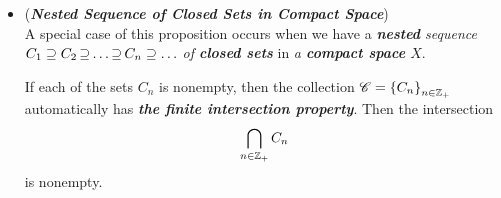 \documentclass[11pt]{article}
\begin{document}
\begin{itemize}
\begin{proof}
\begin{enumerate}
\item $\Rightarrow$  ``\emph{Given any collection $\srC$ of \textbf{closed sets}, if \textbf{every finite intersection} of elements of $\srC$ is \textbf{nonempty}, then the \textbf{intersection of all the elements} of $\srC$ is \textbf{nonempty}}" \qed
\end{enumerate}
\end{proof}



\item \begin{remark} (\emph{\textbf{Nested Sequence of Closed Sets in Compact Space}})\\
A special case of this proposition occurs when we have a \emph{\textbf{nested} sequence $C_1 \supseteq C_2 \,{\supseteq}\ldots{\supseteq}\, C_n \supseteq  \ldots$ of \textbf{closed sets}} in \emph{a \textbf{compact space} $X$}. 

If each of the sets $C_n$ is nonempty, then the collection ${\mathscr C} = \left\{C_n\right\}_{n \in {\mathbb Z}_{+}}$ automatically has \emph{\textbf{the finite intersection
property}}. Then the intersection
\begin{align*}
\bigcap_{n \in {\mathbb Z}_{+}}C_n
\end{align*}
is nonempty.
\end{remark}
\end{itemize}
\end{document}
